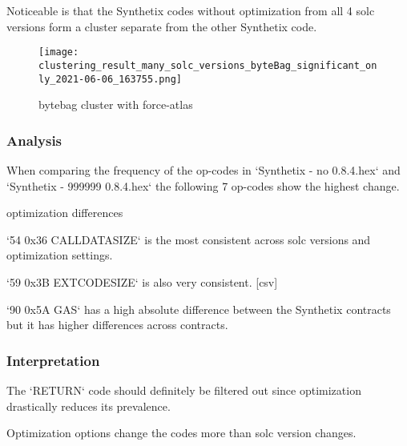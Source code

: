 \documentclass[../main.tex]{subfiles}
\begin{document}
Noticeable is that the Synthetix codes without optimization from all 4 solc versions form a cluster
separate from the other Synthetix code.

\begin{figure*}[ht!]
  \texttt{[image: clustering\_result\_many\_solc\_versions\_byteBag\_significant\_only\_2021-06-06\_163755.png]}
  \caption{bytebag cluster with force-atlas}
  \label{fig:solc_bytebag_cluster}
\end{figure*}

\subsubsection{Analysis}
When comparing the frequency of the op-codes in `Synthetix - no 0.8.4.hex` and
`Synthetix - 999999 0.8.4.hex` the following 7 op-codes show the highest change.

\begin{table}[ht!]
  \centering
  \caption{optimization differences}
  \label{tbl:opt_diff}
\end{table}

\begin{ul}
  \item `54 0x36 CALLDATASIZE` is the most consistent across solc versions and optimization settings.
  \item `59 0x3B EXTCODESIZE` is also very consistent. [csv]
  \item `90 0x5A GAS` has a high absolute difference between the Synthetix contracts but it has higher differences across contracts.
\end{ul}

\subsubsection{Interpretation}
The `RETURN` code should definitely be filtered out since optimization drastically reduces its prevalence.

Optimization options change the codes more than solc version changes.
\end{document}
